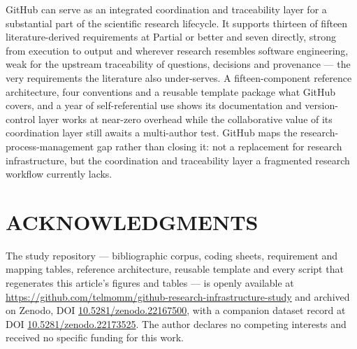 \documentclass{IEEEcsmag}
\begin{document}
GitHub can serve as an integrated coordination and traceability layer for a substantial part of the scientific research lifecycle. It supports thirteen of fifteen literature-derived requirements at Partial or better and seven directly, strong from execution to output and wherever research resembles software engineering, weak for the upstream traceability of questions, decisions and provenance --- the very requirements the literature also under-serves. A fifteen-component reference architecture, four conventions and a reusable template package what GitHub covers, and a year of self-referential use shows its documentation and version-control layer works at near-zero overhead while the collaborative value of its coordination layer still awaits a multi-author test. GitHub maps the research-process-management gap rather than closing it: not a replacement for research infrastructure, but the coordination and traceability layer a fragmented research workflow currently lacks.

\section{ACKNOWLEDGMENTS}
The study repository --- bibliographic corpus, coding sheets, requirement and mapping tables, reference architecture, reusable template and every script that regenerates this article's figures and tables --- is openly available at \url{https://github.com/telmomm/github-research-infrastructure-study} and archived on Zenodo, DOI \href{https://doi.org/10.5281/zenodo.22167500}{10.5281/zenodo.22167500}, with a companion dataset record at DOI \href{https://doi.org/10.5281/zenodo.22173525}{10.5281/zenodo.22173525}. The author declares no competing interests and received no specific funding for this work.

\def\refname{REFERENCES}
\end{document}
